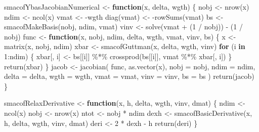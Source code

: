 \documentclass[
  12pt,
  letterpaper,
  DIV=11,
  numbers=noendperiod]{scrartcl}
\newenvironment{Shaded}{\begin{snugshade}}{\end{snugshade}}
\newcommand{\AttributeTok}[1]{\textcolor[rgb]{0.40,0.45,0.13}{#1}}
\newcommand{\ControlFlowTok}[1]{\textcolor[rgb]{0.00,0.23,0.31}{\textbf{#1}}}
\newcommand{\DecValTok}[1]{\textcolor[rgb]{0.68,0.00,0.00}{#1}}
\newcommand{\FunctionTok}[1]{\textcolor[rgb]{0.28,0.35,0.67}{#1}}
\newcommand{\NormalTok}[1]{\textcolor[rgb]{0.00,0.23,0.31}{#1}}
\newcommand{\OtherTok}[1]{\textcolor[rgb]{0.00,0.23,0.31}{#1}}
\newcommand{\SpecialCharTok}[1]{\textcolor[rgb]{0.37,0.37,0.37}{#1}}
\begin{document}
\begin{Shaded}
\begin{Highlighting}[]
\NormalTok{smacofYbasJacobianNumerical }\OtherTok{\textless{}{-}} \ControlFlowTok{function}\NormalTok{(x, delta, wgth) \{}
\NormalTok{  nobj }\OtherTok{\textless{}{-}} \FunctionTok{nrow}\NormalTok{(x)}
\NormalTok{  ndim }\OtherTok{\textless{}{-}} \FunctionTok{ncol}\NormalTok{(x)}
\NormalTok{  vmat }\OtherTok{\textless{}{-}} \SpecialCharTok{{-}}\NormalTok{wgth}
  \FunctionTok{diag}\NormalTok{(vmat) }\OtherTok{\textless{}{-}} \SpecialCharTok{{-}}\FunctionTok{rowSums}\NormalTok{(vmat)}
\NormalTok{  bs }\OtherTok{\textless{}{-}} \FunctionTok{smacofMakeBasis}\NormalTok{(nobj, ndim, vmat)}
\NormalTok{  vinv }\OtherTok{\textless{}{-}} \FunctionTok{solve}\NormalTok{(vmat }\SpecialCharTok{+}\NormalTok{ (}\DecValTok{1} \SpecialCharTok{/}\NormalTok{ nobj)) }\SpecialCharTok{{-}}\NormalTok{ (}\DecValTok{1} \SpecialCharTok{/}\NormalTok{ nobj)}
\NormalTok{  func }\OtherTok{\textless{}{-}} \ControlFlowTok{function}\NormalTok{(x, nobj, ndim, delta, wgth, vmat, vinv, bs) \{}
\NormalTok{    x }\OtherTok{\textless{}{-}} \FunctionTok{matrix}\NormalTok{(x, nobj, ndim)}
\NormalTok{    xbar }\OtherTok{\textless{}{-}} \FunctionTok{smacofGuttman}\NormalTok{(x, delta, wgth, vinv)}
    \ControlFlowTok{for}\NormalTok{ (i }\ControlFlowTok{in} \DecValTok{1}\SpecialCharTok{:}\NormalTok{ndim) \{}
\NormalTok{      xbar[, i] }\OtherTok{\textless{}{-}}\NormalTok{ bs[[i]] }\SpecialCharTok{\%*\%} \FunctionTok{crossprod}\NormalTok{(bs[[i]], vmat }\SpecialCharTok{\%*\%}\NormalTok{ xbar[, i])}
\NormalTok{    \}}
    \FunctionTok{return}\NormalTok{(xbar)}
\NormalTok{  \}}
\NormalTok{  jacob }\OtherTok{\textless{}{-}} \FunctionTok{jacobian}\NormalTok{(}
\NormalTok{    func,}
    \FunctionTok{as.vector}\NormalTok{(x),}
    \AttributeTok{nobj =}\NormalTok{ nobj,}
    \AttributeTok{ndim =}\NormalTok{ ndim,}
    \AttributeTok{delta =}\NormalTok{ delta,}
    \AttributeTok{wgth =}\NormalTok{ wgth,}
    \AttributeTok{vmat =}\NormalTok{ vmat,}
    \AttributeTok{vinv =}\NormalTok{ vinv,}
    \AttributeTok{bs =}\NormalTok{ bs}
\NormalTok{  )}
  \FunctionTok{return}\NormalTok{(jacob)}
\NormalTok{\}}


\NormalTok{smacofRelaxDerivative }\OtherTok{\textless{}{-}} \ControlFlowTok{function}\NormalTok{(x, h, delta, wgth, vinv, dmat) \{}
\NormalTok{  ndim }\OtherTok{\textless{}{-}} \FunctionTok{ncol}\NormalTok{(x)}
\NormalTok{  nobj }\OtherTok{\textless{}{-}} \FunctionTok{nrow}\NormalTok{(x)}
\NormalTok{  ntot }\OtherTok{\textless{}{-}}\NormalTok{ nobj }\SpecialCharTok{*}\NormalTok{ ndim}
\NormalTok{  dexh }\OtherTok{\textless{}{-}} \FunctionTok{smacofBasicDerivative}\NormalTok{(x, h, delta, wgth, vinv, dmat)}
\NormalTok{  deri }\OtherTok{\textless{}{-}} \DecValTok{2} \SpecialCharTok{*}\NormalTok{ dexh }\SpecialCharTok{{-}}\NormalTok{ h}
  \FunctionTok{return}\NormalTok{(deri)}
\NormalTok{\}}


\end{Highlighting}
\end{Shaded}
\end{document}
